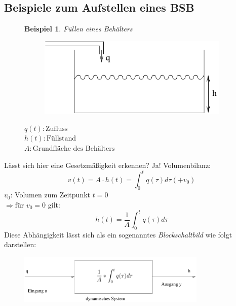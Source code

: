 \documentclass[12pt,a4paper,ngerman]{scrartcl}
\newtheorem{bsp}{Beispiel}[section] %
\begin{document}
\subsection{Beispiele zum Aufstellen eines BSB}
\begin{figure}[H]%
\begin{bsp}
Füllen eines Behälters
\end{bsp}

\begin{minipage}{0.4\linewidth} 
 \begin{figure}[H]
  \includegraphics[width=\linewidth]{sysregel_bsp_1} 
  \end{figure}
\end{minipage}
\begin{minipage}{.6\linewidth}
$q(t):\text{Zufluss}$\\
$h(t):\text{Füllstand}$\\
$A:\text{Grundfläche des Behälters}$
\end{minipage}
\end{figure}
Lässt sich hier eine Gesetzmäßigkeit erkennen? Ja! Volumenbilanz:
\begin{equation*}
 v(t)= A \cdot h(t)=\int_0^t{q(\tau)d\tau}(+v_0) 
\end{equation*}
$v_0$: Volumen zum Zeitpunkt $t=0$ \\$\Rightarrow \text{für } v_0 = 0$ gilt:
\begin{equation*}
h(t)=\frac{1}{A}\int_0^t{q(\tau)d\tau}
\end{equation*}
Diese Abhängigkeit lässt sich als ein sogenanntes \emph{Blockschaltbild} wie folgt darstellen:
\begin{figure}[H]
\includegraphics[width=9cm]{sysregel_bsb1}
\end{figure}
\end{document}
